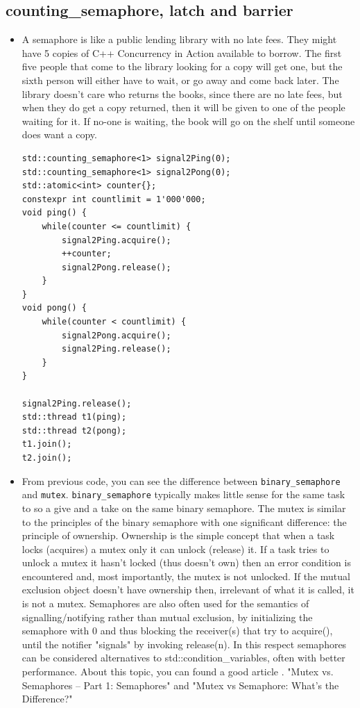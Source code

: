 \documentclass[a4paper,11pt,twoside]{book}
\begin{document}
\subsection{counting\_semaphore, latch and barrier}
\begin{itemize}
	\item A semaphore is like a public lending library with no late fees. They might have 5 copies of C++ Concurrency in Action available to borrow. The first five people that come to the library looking for a copy will get one, but the sixth person will either have to wait, or go away and come back later. The library doesn't care who returns the books, since there are no late fees, but when they do get a copy returned, then it will be given to one of the people waiting for it. If no-one is waiting, the book will go on the shelf until someone does want a copy.
	
\begin{lstlisting}
std::counting_semaphore<1> signal2Ping(0); 
std::counting_semaphore<1> signal2Pong(0);  
std::atomic<int> counter{};
constexpr int countlimit = 1'000'000;
void ping() {
	while(counter <= countlimit) {
		signal2Ping.acquire();   
		++counter;
		signal2Pong.release();
	}
}
void pong() {
	while(counter < countlimit) {
		signal2Pong.acquire();
		signal2Ping.release();   
	}
}

signal2Ping.release();                
std::thread t1(ping);
std::thread t2(pong);	
t1.join();
t2.join();	
\end{lstlisting}
	

    \item From previous code, you can see the difference between \texttt{binary\_semaphore} and \texttt{mutex}. \texttt{binary\_semaphore} typically makes little sense for the same task to so a give and a take on the same binary semaphore. The mutex is similar to the principles of the binary semaphore with one significant difference: the principle of ownership. Ownership is the simple concept that when a task locks (acquires) a mutex only it can unlock (release) it. If a task tries to unlock a mutex it hasn’t locked (thus doesn’t own) then an error condition is encountered and, most importantly, the mutex is not unlocked. If the mutual exclusion object doesn’t have ownership then, irrelevant of what it is called, it is not a mutex. Semaphores are also often used for the semantics of signalling/notifying rather than mutual exclusion, by initializing the semaphore with 0 and thus blocking the receiver(s) that try to acquire(), until the notifier "signals" by invoking release(n). In this respect semaphores can be considered alternatives to std::condition\_variables, often with better performance. About this topic, you can found a good article . "Mutex vs. Semaphores – Part 1: Semaphores" and "Mutex vs Semaphore: What’s the Difference?"
    

\end{itemize}
\end{document}
